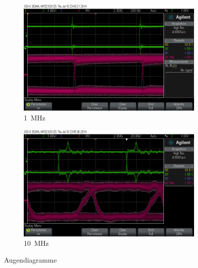 \documentclass[12pt,a4paper]{article}
\begin{document}
\begin{figure}[!h]
  \centering
  \begin{subfigure}[b]{0.6\textwidth}
    \includegraphics[width=\textwidth]{../measurements/20140710/eye_plots/01MHz.png}
    \caption{\SI{1}{\mega\hertz}}
  \end{subfigure}  
  \begin{subfigure}[b]{0.6\textwidth}
    \includegraphics[width=\textwidth]{../measurements/20140710/eye_plots/10MHz.png}
    \caption{\SI{10}{\mega\hertz}}
  \end{subfigure}  
  \caption{Augendiagramme}
  \label{fig:eye_plots_slow}
\end{figure}
\end{document}
